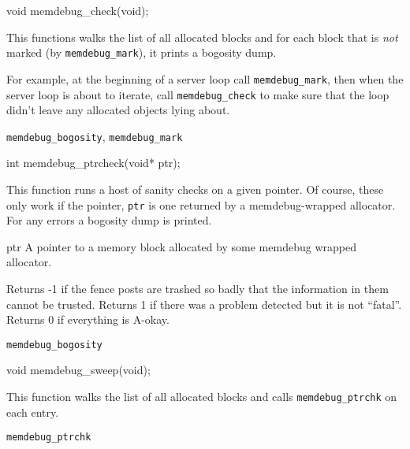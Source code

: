 \begin{apisyn}
	
	\funcproto void 
	memdebug_check(void);
\end{apisyn}
\begin{apidesc}
	This functions walks the list of all allocated blocks and for
	each block that is \emph{not} marked (by {\tt memdebug_mark}), 
	it prints a bogosity dump.

	For example, at the beginning of a server loop call
	{\tt memdebug_mark}, then when the server loop is about
	to iterate, call {\tt memdebug_check} to make sure that
	the loop didn't leave any allocated objects lying about.
\end{apidesc}
\begin{apirel}
	{\tt memdebug_bogosity}, {\tt memdebug_mark}
\end{apirel}

\begin{apisyn}
	
	\funcproto int
	memdebug_ptrcheck(void* ptr);
\end{apisyn}
\begin{apidesc}
	This function runs a host of sanity checks on a given
	pointer.  Of course, these only work if the pointer, {\tt ptr} is
	one returned by a memdebug-wrapped allocator.  For any
	errors a bogosity dump is printed.
\end{apidesc}
\begin{apiparm}
	\item[ptr] A pointer to a memory block allocated by some
		memdebug wrapped allocator.
\end{apiparm}
\begin{apiret}
	Returns -1 if the fence posts are trashed so badly that
	the information in them cannot be trusted.  Returns 1
	if there was a problem detected but it is not ``fatal''.
	Returns 0 if everything is A-okay.
\end{apiret}
\begin{apirel}
	{\tt memdebug_bogosity}
\end{apirel}

\begin{apisyn}

	\funcproto void
	memdebug_sweep(void);
\end{apisyn}
\begin{apidesc}
	This function walks the list of all allocated blocks and calls
	{\tt memdebug_ptrchk} on each entry.
\end{apidesc}
\begin{apirel}
	{\tt memdebug_ptrchk}
\end{apirel}

